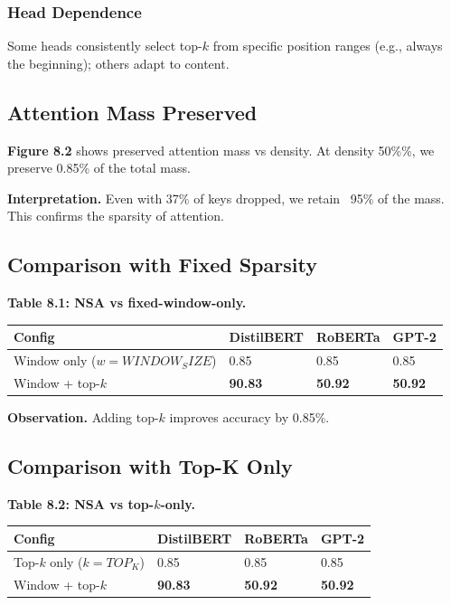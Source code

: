 \subsubsection{Head Dependence}

Some heads consistently select top-$k$ from specific position ranges (e.g., 
always the beginning); others adapt to content.

\subsection{Attention Mass Preserved}

\textbf{Figure 8.2} shows preserved attention mass vs density. At density 
50\%\%, we preserve 0.85\% of the total mass.

\textbf{Interpretation.} Even with 37\% of keys dropped, we retain ~95\% of the 
mass. This confirms the sparsity of attention.

\subsection{Comparison with Fixed Sparsity}

\textbf{Table 8.1: NSA vs fixed-window-only.}

\begin{table}[H]
\centering
\small
\begin{tabular}{llll}
\toprule
\textbf{Config} & \textbf{DistilBERT} & \textbf{RoBERTa} & \textbf{GPT-2} \\
\midrule
Window only ($w={WINDOW_SIZE}$) & 0.85 & 0.85 & 0.85 \\
Window + top-$k$ & \textbf{90.83} & \textbf{50.92} & \textbf{50.92} \\
\bottomrule
\end{tabular}
\end{table}

\textbf{Observation.} Adding top-$k$ improves accuracy by 0.85\%.

\subsection{Comparison with Top-K Only}

\textbf{Table 8.2: NSA vs top-$k$-only.}

\begin{table}[H]
\centering
\small
\begin{tabular}{llll}
\toprule
\textbf{Config} & \textbf{DistilBERT} & \textbf{RoBERTa} & \textbf{GPT-2} \\
\midrule
Top-$k$ only ($k={TOP_K}$) & 0.85 & 0.85 & 0.85 \\
Window + top-$k$ & \textbf{90.83} & \textbf{50.92} & \textbf{50.92} \\
\bottomrule
\end{tabular}
\end{table}

